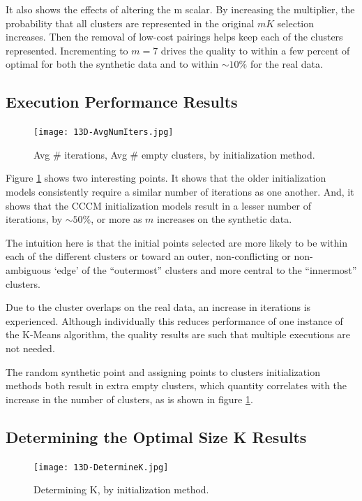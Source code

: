 \documentclass{article}
\begin{document}
It also shows the effects of altering the m scalar.  By increasing the multiplier, the probability that all clusters are represented in the original $mK$ selection increases. Then the removal of low-cost pairings helps keep each of the clusters represented.  Incrementing to $m=7$ drives the quality to within a few percent of optimal for both the synthetic data and to within $\sim$$10\%$ for the real data.

\subsection{Execution Performance Results}

\begin{figure}
  \centering
  \texttt{[image: 13D-AvgNumIters.jpg]}
  \caption{Avg \# iterations, Avg \# empty clusters, by initialization method.}
  \label{fig:numIter13D}
\end{figure}

Figure \ref{fig:numIter13D} shows two interesting points.  It shows that the older initialization models consistently require a similar number of iterations as one another.  And, it shows that the CCCM initialization models result in a lesser number of iterations, by $\sim$$50\%$, or more as $m$ increases on the synthetic data.

The intuition here is that the initial points selected are more likely to be within each of the different clusters or toward an outer, non-conflicting or non-ambiguous ‘edge’ of the “outermost” clusters and more central to the “innermost” clusters. 

Due to the cluster overlaps on the real data, an increase in iterations is experienced.  Although individually this reduces performance of one instance of the K-Means algorithm, the quality results are such that multiple executions are not needed.

The random synthetic point and assigning points to clusters initialization methods both result in extra empty clusters, which quantity correlates with the increase in the number of clusters, as is shown in figure \ref{fig:numIter13D}.

\subsection{Determining the Optimal Size K Results}

\begin{figure}
  \centering
  \texttt{[image: 13D-DetermineK.jpg]}
  \caption{Determining K, by initialization method.}
  \label{fig:determineK13D}
\end{figure}
\end{document}
